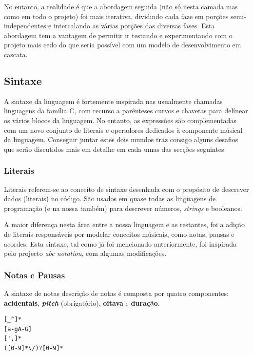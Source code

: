 No entanto, a realidade é que a abordagem seguida (não só nesta camada mas como em todo o projeto) foi mais iterativa, dividindo cada faze em porções semi-independentes e intercalando as várias porções das diversas fases. Esta abordagem tem a vantagem de permitir ir testando e experimentando com o projeto mais cedo do que seria possível com um modelo de desenvolvimento em cascata.

\subsection{Sintaxe}
A sintaxe da linguagem é fortemente inspirada nas usualmente chamadas linguagens da família C, com recurso a parênteses curvos e chavetas para delínear os vários blocos da linguagem. No entanto, as expressões são complementadas com um novo conjunto de literais e operadores dedicados à componente músical da linguagem. Conseguir juntar estes dois mundos traz consigo alguns desafios que serão discutidos mais em detalhe em cada umas das secções seguintes.

\subsubsection{\textbf{Literais}}
Literais referem-se ao conceito de sintaxe desenhada com o propósito de descrever dados (literais) no código. São usados em quase todas as linguagens de programação (e na nossa também) para descrever números, \textit{strings} e booleanos.

A maior diferença nesta área entre a nossa linguagem e as restantes, foi a adição de literais responsáveis por modelar conceitos músicais, como notas, pausas e acordes. Esta sintaxe, tal como já foi mencionado anteriormente, foi inspirada pelo projecto \textit{abc notation}, com algumas modificações.

\subsubsection{\textbf{Notas e Pausas}}
A sintaxe de notas descrição de notas é composta por quatro componentes: \textbf{acidentais}, \textbf{\textit{pitch}} (obrigatório), \textbf{oitava} e \textbf{duração}.

\begin{lstlisting}[caption=Expressão Regular que identifica uma nota (quebras de linha adicionadas apenas para claridade de leitura)]
[_^]*
[a-gA-G]
[',]*
([0-9]*\/)?[0-9]*
\end{lstlisting}

